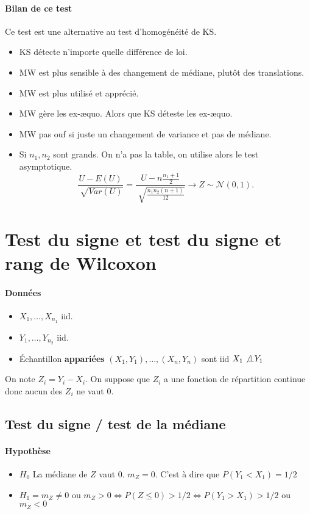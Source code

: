 \documentclass{article}
\theoremstyle{plain}%
\theoremstyle{definition}
\theoremstyle{remark}
\begin{document}
\paragraph*{Bilan de ce test} Ce test est une alternative au test d'homogénéité de KS.
\begin{itemize}
    \item KS détecte n'importe quelle différence de loi. 
    \item MW est plus sensible à des changement de médiane, plutôt des translations.
    \item MW est plus utilisé et apprécié.
    \item MW gère les ex-æquo. Alors que KS déteste les ex-æquo.
    \item MW pas ouf si juste un changement de variance et pas de médiane.
    \item Si $ n_1, n_2 $ sont grands. On n'a pas la table, on utilise alors le test asymptotique.
    \[
        \frac{U - E(U)}{\sqrt[]{Var(U)}} = \frac{U - n \frac{n_1 + 1}{2}}{\sqrt[]{\frac{n_1 n_2 (n+1)}{12}}} \to Z \sim \mathcal{N}(0,1)
    .\]
\end{itemize}

\section{Test du signe et test du signe et rang de Wilcoxon}
\paragraph*{Données}
\begin{itemize}
    \item $ X_1, \dots, X_{n_1}  $ iid. 
    \item $ Y_1, \dots, Y_{n_2}  $ iid. 
    \item Échantillon \textbf{appariées} $ (X_1, Y_1), \dots, (X_n, Y_n) $ sont iid $ X_1 \not \bot Y_1 $ 
\end{itemize}
On note $ Z_i = Y_i - X_i $. On suppose que $ Z_i $  a une fonction de répartition continue donc aucun des $ Z_i $ ne vaut 0.

\subsection{Test du signe / test de la médiane}

\paragraph*{Hypothèse}
\begin{itemize}
    \item $ H_0 $ La médiane de $ Z $ vaut 0. $ m_Z = 0 $. C'est à dire que $ P(Y_1 < X_1) = 1/2 $ 
    \item $ H_1 = m_Z \neq 0 $ ou $ m_Z > 0 \Leftrightarrow P(Z \leq 0) > 1/2 \Leftrightarrow P(Y_1 > X_1) > 1/2$ ou $ m_Z < 0 $ 
\end{itemize}
\end{document}
